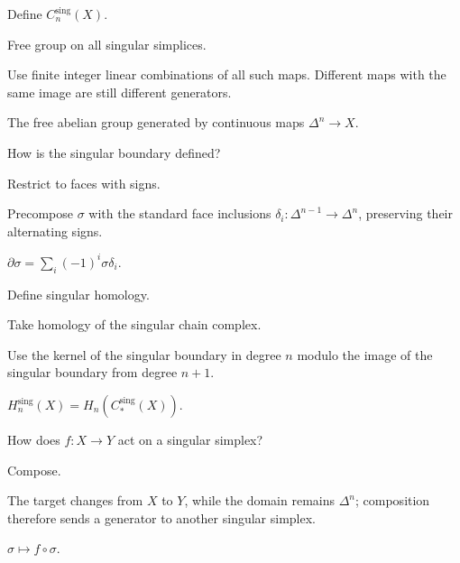 \begin{exercise}\label{exr:viii17-12}
Define \(C_n^{\mathrm{sing}}(X)\).
\end{exercise}
\begin{hint}
Free group on all singular simplices.

Use finite integer linear combinations of all such maps. Different maps with the same image are still different generators.
\end{hint}
\begin{solution}
The free abelian group generated by continuous maps \(\Delta^n\to X\).
\end{solution}

\begin{exercise}\label{exr:viii17-13}
How is the singular boundary defined?
\end{exercise}
\begin{hint}
Restrict to faces with signs.

Precompose \(\sigma\) with the standard face inclusions \(\delta_i:\Delta^{n-1}\to\Delta^n\), preserving their alternating signs.
\end{hint}
\begin{solution}
\(\partial\sigma=\sum_i(-1)^i\sigma\delta_i\).
\end{solution}

\begin{exercise}\label{exr:viii17-14}
Define singular homology.
\end{exercise}
\begin{hint}
Take homology of the singular chain complex.

Use the kernel of the singular boundary in degree \(n\) modulo the image of the singular boundary from degree \(n+1\).
\end{hint}
\begin{solution}
\(H_n^{\mathrm{sing}}(X)=H_n(C_*^{\mathrm{sing}}(X))\).
\end{solution}

\begin{exercise}\label{exr:viii17-15}
How does \(f:X\to Y\) act on a singular simplex?
\end{exercise}
\begin{hint}
Compose.

The target changes from \(X\) to \(Y\), while the domain remains \(\Delta^n\); composition therefore sends a generator to another singular simplex.
\end{hint}
\begin{solution}
\(\sigma\mapsto f\circ\sigma\).
\end{solution}

